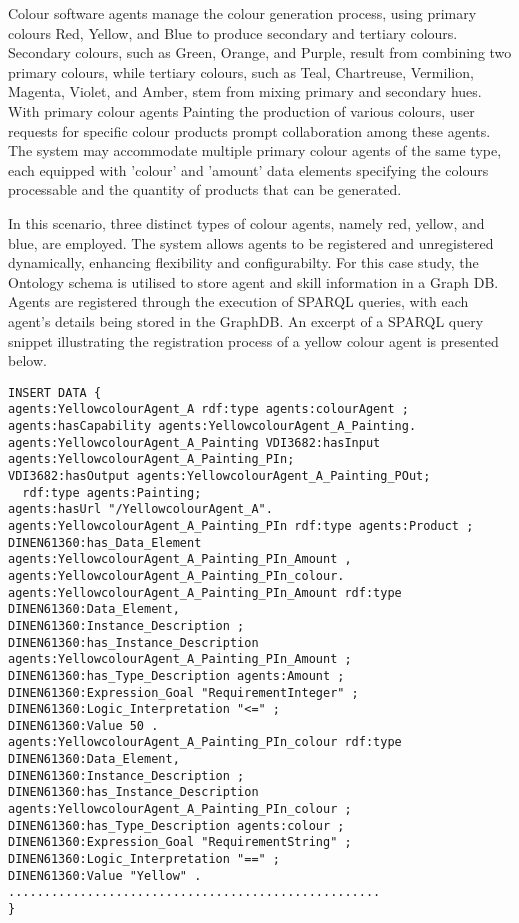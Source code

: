\begin{bibunit}
Colour software agents manage the colour generation process, using primary colours Red, Yellow, and Blue to produce secondary and tertiary colours. Secondary colours, such as Green, Orange, and Purple, result from combining two primary colours, while tertiary colours, such as Teal, Chartreuse, Vermilion, Magenta, Violet, and Amber, stem from mixing primary and secondary hues. With primary colour agents Painting the production of various colours, user requests for specific colour products prompt collaboration among these agents. The system may accommodate multiple primary colour agents of the same type, each equipped with 'colour' and 'amount' data elements specifying the colours processable and the quantity of products that can be generated.

In this scenario, three distinct types of colour agents, namely red, yellow, and blue, are employed. The system allows agents to be registered and unregistered dynamically, enhancing flexibility and configurabilty. For this case study, the Ontology schema \cite{aljosha_cap_skill_plug_play} is utilised to store agent and skill information in a Graph DB. Agents are registered through the execution of SPARQL queries, with each agent's details being stored in the GraphDB. An excerpt of a SPARQL query snippet illustrating the registration process of a yellow colour agent is presented below.


\begin{lstlisting}
INSERT DATA {
agents:YellowcolourAgent_A rdf:type agents:colourAgent ;
agents:hasCapability agents:YellowcolourAgent_A_Painting.
agents:YellowcolourAgent_A_Painting VDI3682:hasInput agents:YellowcolourAgent_A_Painting_PIn;
VDI3682:hasOutput agents:YellowcolourAgent_A_Painting_POut;
  rdf:type agents:Painting;
agents:hasUrl "/YellowcolourAgent_A".
agents:YellowcolourAgent_A_Painting_PIn rdf:type agents:Product ;
DINEN61360:has_Data_Element agents:YellowcolourAgent_A_Painting_PIn_Amount ,
agents:YellowcolourAgent_A_Painting_PIn_colour.
agents:YellowcolourAgent_A_Painting_PIn_Amount rdf:type DINEN61360:Data_Element,
DINEN61360:Instance_Description ;
DINEN61360:has_Instance_Description agents:YellowcolourAgent_A_Painting_PIn_Amount ;
DINEN61360:has_Type_Description agents:Amount ;
DINEN61360:Expression_Goal "RequirementInteger" ;
DINEN61360:Logic_Interpretation "<=" ;
DINEN61360:Value 50 .
agents:YellowcolourAgent_A_Painting_PIn_colour rdf:type DINEN61360:Data_Element,
DINEN61360:Instance_Description ;
DINEN61360:has_Instance_Description agents:YellowcolourAgent_A_Painting_PIn_colour ;
DINEN61360:has_Type_Description agents:colour ;
DINEN61360:Expression_Goal "RequirementString" ;
DINEN61360:Logic_Interpretation "==" ;
DINEN61360:Value "Yellow" .
....................................................
}
\end{lstlisting}


\end{bibunit}
